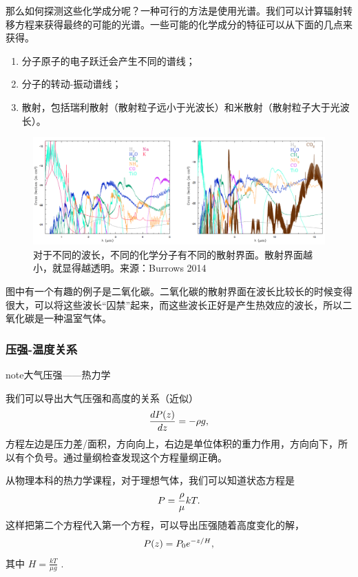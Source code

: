 \documentclass[letterpaper,10pt,english]{sphinxmanual}
\begin{document}
那么如何探测这些化学成分呢？一种可行的方法是使用光谱。我们可以计算辐射转移方程来获得最终的可能的光谱。一些可能的化学成分的特征可以从下面的几点来获得。
\begin{enumerate}
\item {} 
分子原子的电子跃迁会产生不同的谱线；

\item {} 
分子的转动-振动谱线；

\item {} 
散射，包括瑞利散射（散射粒子远小于光波长）和米散射（散射粒子大于光波长）。

\end{enumerate}
\begin{figure}[htbp]
\centering
\capstart

\includegraphics{atmosphereAtomMolecular.png}
\caption{对于不同的波长，不同的化学分子有不同的散射界面。散射界面越小，就显得越透明。来源：Burrows 2014}\end{figure}

图中有一个有趣的例子是二氧化碳。二氧化碳的散射界面在波长比较长的时候变得很大，可以将这些波长“囚禁”起来，而这些波长正好是产生热效应的波长，所以二氧化碳是一种温室气体。


\subsubsection{压强-温度关系}
\label{atmosphere:id5}
\begin{notice}{note}{大气压强——热力学}

我们可以导出大气压强和高度的关系（近似）
\begin{gather}
\begin{split}\frac{dP(z)}{dz} = -\rho g,\end{split}\notag
\end{gather}
方程左边是压力差/面积，方向向上，右边是单位体积的重力作用，方向向下，所以有个负号。通过量纲检查发现这个方程量纲正确。

从物理本科的热力学课程，对于理想气体，我们可以知道状态方程是
\begin{gather}
\begin{split}P = \frac{\rho}{\mu}kT.\end{split}\notag
\end{gather}
这样把第二个方程代入第一个方程，可以导出压强随着高度变化的解，
\begin{gather}
\begin{split}P(z) = P_0 e^{-z/H},\end{split}\notag
\end{gather}
其中 \(H=\frac{kT}{\mu g}\) .
\end{notice}
\end{document}
